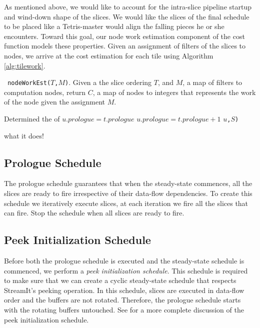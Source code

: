 As mentioned above, we would like to account for the intra-slice
pipeline startup and wind-down shape of the slices.  We would like the
slices of the final schedule to be placed like a Tetris-master would
align the falling pieces he or she encounters.  Toward this goal, our
node work estimation component of the cost function models these
properties.  Given an assignment of filters of the slices to nodes,
we arrive at the cost estimation for each tile using Algorithm
\ref{alg:tilework}. 

\begin{algorithm}
\caption{nodeWorkEst} \label{alg:tilework} {\tt
nodeWorkEst(}$T${\tt ,}$M${\tt )}. Given a the slice ordering $T$, and
$M$, a map of filters to computation nodes, return $C$, a map of nodes
to integers that represents the work of the node given the assignment $M$.
\begin{algorithmic}
\STATE Determined the  of 
\STATE $u.prologue = t.prologue$
\ELSE
\STATE $u.prologue = t.prologue + 1$ 
\ENDIF 
{}$u${\tt ,}$S${\tt )}
\ENDFOR
\end{algorithmic}
\end{algorithm}

what it does!

\subsection{Prologue Schedule}
The prologue schedule guarantees that when the steady-state commences,
all the slices are ready to fire irrespective of their data-flow
dependencies.  To create this schedule we iteratively execute slices,
at each iteration we fire all the slices that can fire.  Stop the
schedule when all slices are ready to fire.

\subsection{Peek Initialization Schedule}
Before both the prologue schedule is executed and the steady-state
schedule is commenced, we perform a {\it peek initialization
schedule}.  This schedule is required to make sure that we can create
a cyclic steady-state schedule that respects StreamIt's peeking
operation.  In this schedule, slices are executed in data-flow order
and the buffers are not rotated.  Therefore, the prologue schedule
starts with the rotating buffers untouched.  See
\cite{streamitcc} for a more complete discussion of the peek
initialization schedule.


